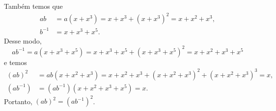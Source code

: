     	\par\vspace{0.3cm} Também temos que
    	\begin{align*}
        	ab &= a(x+x^3) = x+x^3+(x+x^3)^2 = x+x^2+x^3, \\
        	b^{-1} &= x+x^3+x^5.
    	\end{align*}
    	Desse modo,
    	\begin{equation*}
        	ab^{-1} = a(x+x^3+x^5) = x+x^3+x^5+(x+x^3+x^5)^2 = x+x^2+x^3+x^5
    	\end{equation*}
    	e temos
    	\begin{align*}
        	(ab)^2 &= ab(x+x^2+x^3) = x+x^2+x^3 + (x+x^2+x^3)^2 + (x+x^2+x^3)^3 = x, \\
        	(ab^{-1}) &= (ab^{-1})(x+x^2+x^3+x^5) = x.
    	\end{align*}
    	Portanto, $(ab)^2=(ab^{-1})^2$.
